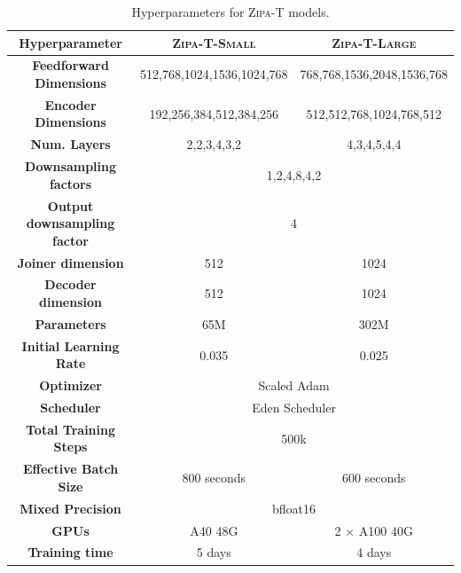 \documentclass[11pt]{article}
\begin{document}
\begin{table}[h!]
\small
\centering
\begin{tabular}{ccc}
\toprule
\textbf{Hyperparameter}               & \textsc{Zipa-T-Small} & \textsc{Zipa-T-Large}  \\ \midrule
\textbf{Feedforward Dimensions}            & 512,768,1024,1536,1024,768                   & 768,768,1536,2048,1536,768                                     \\ 
\textbf{Encoder Dimensions} & 192,256,384,512,384,256 & 512,512,768,1024,768,512\\
\textbf{Num. Layers}                  & 2,2,3,4,3,2                     & 4,3,4,5,4,4                                         \\ 
\textbf{Downsampling factors}         & \multicolumn{2}{c}{1,2,4,8,4,2}                            \\ 
\textbf{Output downsampling factor}         & \multicolumn{2}{c}{4}                            \\ 
\textbf{Joiner dimension} & 512 & 1024 \\
\textbf{Decoder dimension} & 512 & 1024\\
\textbf{Parameters}                   & 65M                   & 302M                               \\ 
\textbf{Initial Learning Rate}        &  0.035                  & 0.025                               \\
\textbf{Optimizer} & \multicolumn{2}{c}{Scaled Adam}             \\ 
\textbf{Scheduler}                    & \multicolumn{2}{c}{Eden Scheduler}             \\ 
\textbf{Total Training Steps}         & \multicolumn{2}{c}{500k}          \\ 
\textbf{Effective Batch Size}        & 800 seconds                    & 600 seconds                                      \\ 
\textbf{Mixed Precision}              & \multicolumn{2}{c}{bfloat16}                            \\ 
\textbf{GPUs} & A40 48G & 2 $\times$ A100 40G \\
\textbf{Training time} & 5 days & 4 days \\\bottomrule
\end{tabular}
\caption{Hyperparameters for \textsc{Zipa-T} models.}
\label{tab:zipa-t-hyper}
\end{table}
\end{document}
